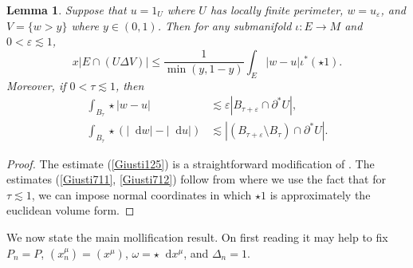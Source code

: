 \documentclass[reqno,12pt,letterpaper]{amsart}
\newcommand*\dif{\mathop{}\!\mathrm{d}}
\newtheorem{lemma}[theorem]{Lemma}
\theoremstyle{definition}
\numberwithin{equation}{section}
\begin{document}
\begin{lemma}
Suppose that $u = 1_U$ where $U$ has locally finite perimeter, $w = u_\varepsilon$, and $V = \{w > y\}$ where $y \in (0, 1)$.
Then for any submanifold $\iota: E \to M$ and $0 < \varepsilon \lesssim 1$,
\begin{equation}\label{Giusti125}
x|E \cap (U \Delta V)| \leq \frac{1}{\min(y, 1 - y)} \int_E |w - u| \iota^*(\star 1).
\end{equation}
Moreover, if $0 < \tau \lesssim 1$, then
\begin{align}
\int_{B_\tau} \star |w - u| &\lesssim \varepsilon |B_{\tau + \varepsilon} \cap \partial^* U|, \label{Giusti711}\\
\int_{B_\tau} \star (|\dif w| - |\dif u|) &\lesssim |(B_{\tau + \varepsilon} \setminus B_\tau) \cap \partial^* U|. \label{Giusti712}
\end{align}
\end{lemma}
\begin{proof}
The estimate (\ref{Giusti125}) is a straightforward modification of \cite[Lemma 1.25]{Giusti77}.
The estimates (\ref{Giusti711}, \ref{Giusti712}) follow from \cite[Lemma 7.2]{Giusti77} where we use the fact that for $\tau \lesssim 1$, we can impose normal coordinates in which $\star 1$ is approximately the euclidean volume form.
\end{proof}

We now state the main mollification result.
On first reading it may help to fix $P_n = P$, $(x^\mu_n) = (x^\mu)$, $\omega = \star \dif x^\mu$, and $\Delta_n = 1$.
\end{document}
